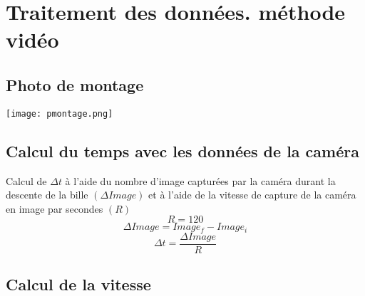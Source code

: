 \documentclass{article}
\begin{document}
        \section{Traitement des données. méthode vidéo}
            \vspace{4mm}
            \subsection{Photo de montage}
                \texttt{[image: pmontage.png]}
                \vspace{8mm}
            \subsection{Calcul du temps avec les données de la caméra}

                Calcul de $ \Delta t $ à l’aide du nombre d’image capturées par la caméra  durant la descente de la bille $( \Delta Image)$ et à l’aide de la vitesse de capture de la caméra en image par secondes $(R)$
                \setcounter{equation}{0}
                \vspace{5mm}
                \begin{equation}
                    R = 120
                \end{equation}
                \vspace{5mm}
                \begin{equation}
                    \Delta Image = Image_f - Image_i
                \end{equation}
                \vspace{5mm}
                \begin{equation}
                    \Delta t = \frac{\Delta Image}{R}
                \end{equation}
                \vspace{10mm}
            \subsection{Calcul de la vitesse}
\end{document}
